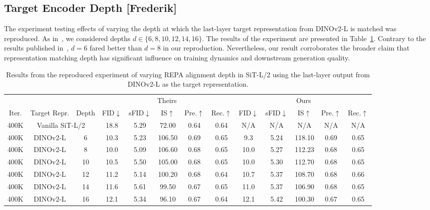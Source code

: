 \documentclass{article}
\begin{document}
\subsection{Target Encoder Depth [Frederik]}

The experiment testing effects of varying the depth at which the last-layer target representation from DINOv2-L is matched was reproduced. As in~\cite{yu2025repa}, we considered depths $d\in\{6,8,10,12,14,16\}$. The results of the experiment are presented in Table~\ref{tab:repa-depth}. Contrary to the results published in~\cite{yu2025repa}, $d=6$ fared better than $d=8$ in our reproduction. Nevertheless, our result corroborates the broader claim that representation matching depth has significant influence on training dynamics and downstream generation quality.

\begin{table}[t]
    \centering
    \begin{tabular}{c c c | c c c c c | c c c c c}
        \toprule
              &              &           & \multicolumn{5}{c|}{Theirs} & \multicolumn{5}{c}{Ours} \\
        Iter. & Target Repr. & Depth & FID$\downarrow$ & sFID$\downarrow$ & IS$\uparrow$ & Pre.$\uparrow$ & Rec.$\uparrow$ & FID$\downarrow$ & sFID$\downarrow$ & IS$\uparrow$ & Pre.$\uparrow$ & Rec.$\uparrow$ \\
        \midrule
        400K & \multicolumn{2}{c|}{Vanilla SiT-L/2~\cite{sit}}
             & 18.8 & 5.29 & 72.00 & 0.64 & 0.64
             & N/A & N/A & N/A & N/A & N/A \\
        \hline
        400K & DINOv2-L & 6
             & 10.3 & 5.23 & 106.50 & 0.69 & 0.65
             & 9.3 & 5.24 & 118.10 & 0.69 & 0.65 \\
        400K & DINOv2-L & 8
             & 10.0 & 5.09 & 106.60 & 0.68 & 0.65
             & 10.0 & 5.27 & 112.23 & 0.68 & 0.65 \\
        400K & DINOv2-L & 10
             & 10.5 & 5.50 & 105.00 & 0.68 & 0.65
             & 10.0 & 5.30 & 112.70 & 0.68 & 0.65 \\
        400K & DINOv2-L & 12
             & 11.2 & 5.14 & 100.20 & 0.68 & 0.64
             & 10.7 & 5.37 & 108.70 & 0.68 & 0.66 \\
        400K & DINOv2-L & 14
             & 11.6 & 5.61 & 99.50 & 0.67 & 0.65
             & 11.0 & 5.37 & 106.90 & 0.68 & 0.65 \\
        400K & DINOv2-L & 16
             & 12.1 & 5.34 & 96.10 & 0.67 & 0.64
             & 12.1 & 5.42 & 100.30 & 0.67 & 0.65 \\
        \bottomrule
    \end{tabular}
    \caption{Results from the reproduced experiment of varying REPA alignment depth in SiT-L/2 using the last-layer output from DINOv2-L as the target representation.}
   
    \label{tab:repa-depth}
\end{table}
\end{document}
